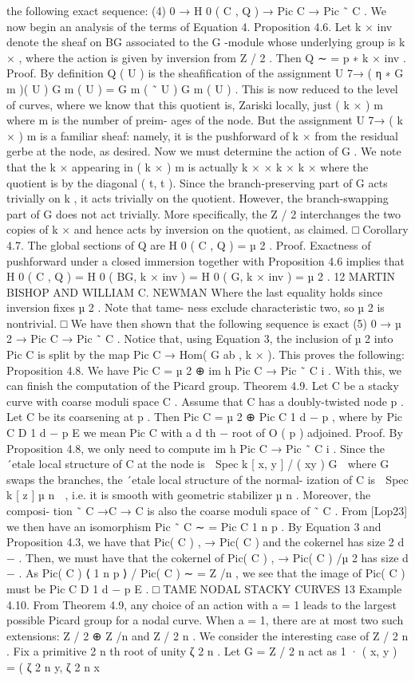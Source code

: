\documentclass{article}
\begin{document}
the following exact sequence: (4) 0 → H 0 ( C , Q ) → Pic C → Pic ˜ C . We now begin an analysis of the terms of Equation 4. Proposition 4.6. Let k × inv denote the sheaf on BG associated to the G -module whose underlying group is k × , where the action is given by inversion from Z / 2 . Then Q ∼ = p ∗ k × inv . Proof. By definition Q ( U ) is the sheafification of the assignment U 7→ ( η ∗ G m )( U ) G m ( U ) = G m ( ˜ U ) G m ( U ) . This is now reduced to the level of curves, where we know that this quotient is, Zariski locally, just ( k × ) m where m is the number of preim- ages of the node. But the assignment U 7→ ( k × ) m is a familiar sheaf: namely, it is the pushforward of k × from the residual gerbe at the node, as desired. Now we must determine the action of G . We note that the k × appearing in ( k × ) m is actually k × × k × k × where the quotient is by the diagonal ( t, t ). Since the branch-preserving part of G acts trivially on k , it acts trivially on the quotient. However, the branch-swapping part of G does not act trivially. More specifically, the Z / 2 interchanges the two copies of k × and hence acts by inversion on the quotient, as claimed. □ Corollary 4.7. The global sections of Q are H 0 ( C , Q ) = µ 2 . Proof. Exactness of pushforward under a closed immersion together with Proposition 4.6 implies that H 0 ( C , Q ) = H 0 ( BG, k × inv ) = H 0 ( G, k × inv ) = µ 2 . 12 MARTIN BISHOP AND WILLIAM C. NEWMAN Where the last equality holds since inversion fixes µ 2 . Note that tame- ness exclude characteristic two, so µ 2 is nontrivial. □ We have then shown that the following sequence is exact (5) 0 → µ 2 → Pic C → Pic ˜ C . Notice that, using Equation 3, the inclusion of µ 2 into Pic C is split by the map Pic C → Hom( G ab , k × ). This proves the following: Proposition 4.8. We have Pic C = µ 2 ⊕ im h Pic C → Pic ˜ C i . With this, we can finish the computation of the Picard group. Theorem 4.9. Let C be a stacky curve with coarse moduli space C . Assume that C has a doubly-twisted node p . Let C be its coarsening at p . Then Pic C = µ 2 ⊕ Pic C 1 d − p , where by Pic C D 1 d − p E we mean Pic C with a d th − root of O ( p ) adjoined. Proof. By Proposition 4.8, we only need to compute im h Pic C → Pic ˜ C i . Since the ´etale local structure of C at the node is  Spec k [ x, y ] / ( xy ) G  where G swaps the branches, the ´etale local structure of the normal- ization of C is  Spec k [ z ] µ n  , i.e. it is smooth with geometric stabilizer µ n . Moreover, the composi- tion ˜ C →C → C is also the coarse moduli space of ˜ C . From [Lop23] we then have an isomorphism Pic ˜ C ∼ = Pic C 1 n p . By Equation 3 and Proposition 4.3, we have that Pic( C ) , → Pic( C ) and the cokernel has size 2 d − . Then, we must have that the cokernel of Pic( C ) , → Pic( C ) /µ 2 has size d − . As Pic( C ) ⟨ 1 n p ⟩ / Pic( C ) ∼ = Z /n , we see that the image of Pic( C ) must be Pic C D 1 d − p E . □ TAME NODAL STACKY CURVES 13 Example 4.10. From Theorem 4.9, any choice of an action with a = 1 leads to the largest possible Picard group for a nodal curve. When a = 1, there are at most two such extensions: Z / 2 ⊕ Z /n and Z / 2 n . We consider the interesting case of Z / 2 n . Fix a primitive 2 n th root of unity ζ 2 n . Let G = Z / 2 n act as 1 · ( x, y ) = ( ζ 2 n y, ζ 2 n x 
\end{document}
